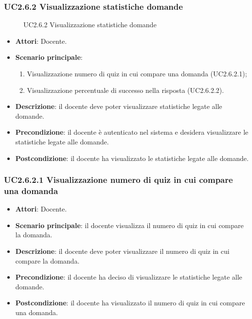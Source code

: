 \subsubsection{UC2.6.2 Visualizzazione statistiche domande}
\begin{figure}[H]
\centering
\noindent{}
\caption{UC2.6.2 Visualizzazione statistiche domande}
\end{figure}
\begin{itemize}
\item \textbf{Attori}: Docente.
\item \textbf{Scenario principale}:
\begin{enumerate}
\item Visualizzazione numero di quiz in cui compare una domanda (UC2.6.2.1);
\item Visualizzazione percentuale di successo nella risposta (UC2.6.2.2).
\end{enumerate}
\item \textbf{Descrizione}: il docente deve poter visualizzare statistiche legate alle domande.
\item \textbf{Precondizione}: il docente è autenticato nel sistema e desidera visualizzare le statistiche legate alle domande.
\item \textbf{Postcondizione}: il docente ha visualizzato le statistiche legate alle domande.
\end{itemize}
\subsubsection{UC2.6.2.1 Visualizzazione numero di quiz in cui compare una domanda}
\begin{itemize}
\item \textbf{Attori}: Docente.
\item \textbf{Scenario principale}: il docente visualizza il numero di quiz in cui compare la domanda.
\item \textbf{Descrizione}: il docente deve poter visualizzare il numero di quiz in cui compare la domanda.
\item \textbf{Precondizione}: il docente ha deciso di visualizzare le statistiche legate alle domande.
\item \textbf{Postcondizione}: il docente ha visualizzato il numero di quiz in cui compare una domanda.
\end{itemize}
